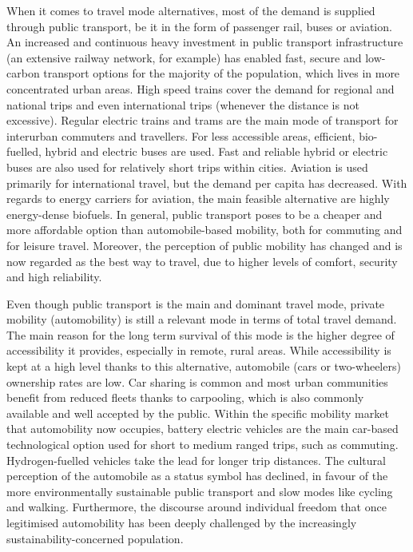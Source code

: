 {When it comes to travel mode alternatives, most of the demand is supplied through public transport, be it in the form of passenger rail, buses or aviation. An increased and continuous heavy investment in public transport infrastructure (an extensive railway network, for example) has enabled fast, secure and low-carbon transport options for the majority of the population, which lives in more concentrated urban areas. High speed trains cover the demand for regional and national trips and even international trips (whenever the distance is not excessive). Regular electric trains and trams are the main mode of transport for interurban commuters and travellers. For less accessible areas, efficient, bio-fuelled, hybrid and electric buses are used. Fast and reliable hybrid or electric buses are also used for relatively short trips within cities. Aviation is used primarily for international travel, but the demand per capita has decreased. With regards to energy carriers for aviation, the main feasible alternative are highly energy-dense biofuels. In general, public transport poses to be a cheaper and more affordable option than automobile-based mobility, both for commuting and for leisure travel. Moreover, the perception of public mobility has changed and is now regarded as the best way to travel, due to higher levels of comfort, security and high reliability.

Even though public transport is the main and dominant travel mode, private mobility (automobility) is still a relevant mode in terms of total travel demand. The main reason for the long term survival of this mode is the higher degree of accessibility it provides, especially in remote, rural areas. While accessibility is kept at a high level thanks to this alternative, automobile (cars or two-wheelers) ownership rates are low. Car sharing is common and most urban communities benefit from reduced fleets thanks to carpooling, which is also commonly available and well accepted by the public. Within the specific mobility market that automobility now occupies, battery electric vehicles are the main car-based technological option used for short to medium ranged trips, such as commuting. Hydrogen-fuelled vehicles take the lead for longer trip distances. The cultural perception of the automobile as a status symbol has declined, in favour of the more environmentally sustainable public transport and slow modes like cycling and walking. Furthermore, the discourse around individual freedom that once legitimised automobility has been deeply challenged by the increasingly sustainability-concerned population.

}

